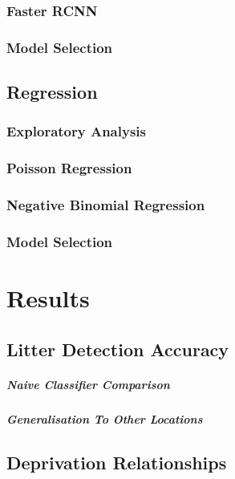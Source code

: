 \documentclass{thesis}
\begin{document}
\subsection{Faster RCNN}
\subsection{Model Selection}

\section{Regression}
\subsection{Exploratory Analysis}
\subsection{Poisson Regression}
\subsection{Negative Binomial Regression}
\subsection{Model Selection}


\chapter{Results}
\todo{}

\section{Litter Detection Accuracy}
\paragraph{Naive Classifier Comparison}
\paragraph{Generalisation To Other Locations}
\section{Deprivation Relationships}
\end{document}
